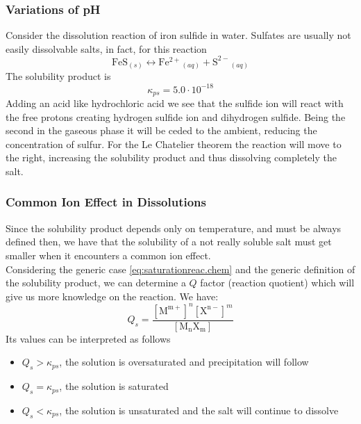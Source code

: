 \documentclass[../qm.tex]{subfiles}
\begin{document}
\subsubsection{Variations of pH}
Consider the dissolution reaction of iron sulfide in water. Sulfates are usually not easily dissolvable salts, in fact, for this reaction
\begin{equation*}
	\mathrm{FeS}_{(s)}\longleftrightarrow\mathrm{Fe^{2+}}_{(aq)}+\mathrm{S^{2-}}_{(aq)}
\end{equation*}
The solubility product is
\begin{equation*}
	\kappa_{ps}=5.0\cdot10^{-18}
\end{equation*}
Adding an acid like hydrochloric acid we see that the sulfide ion will react with the free protons creating hydrogen sulfide ion and dihydrogen sulfide. Being the second in the gaseous phase it will be ceded to the ambient, reducing the concentration of sulfur. For the Le Chatelier theorem the reaction will move to the right, increasing the solubility product and thus dissolving completely the salt.
\subsubsection{Common Ion Effect in Dissolutions}
Since the solubility product depends only on temperature, and must be always defined then, we have that the solubility of a not really soluble salt must get smaller when it encounters a common ion effect.\\
Considering the generic case \eqref{eq:saturationreac.chem} and the generic definition of the solubility product, we can determine a $Q$ factor (reaction quotient) which will give us more knowledge on the reaction. We have:
\begin{equation}
	Q_s=\frac{\left[ \mathrm{M^{m+}} \right]^n\left[ \mathrm{X^{n-}} \right]^m}{\left[ \mathrm{M_nX_m} \right]}
	\label{eq:solutionrcoeff.chem}
\end{equation}
Its values can be interpreted as follows
\begin{itemize}
\item $Q_s>\kappa_{ps}$, the solution is oversaturated and precipitation will follow
\item $Q_s=\kappa_{ps}$, the solution is saturated
\item $Q_s<\kappa_{ps}$, the solution is unsaturated and the salt will continue to dissolve
\end{itemize}
\end{document}
